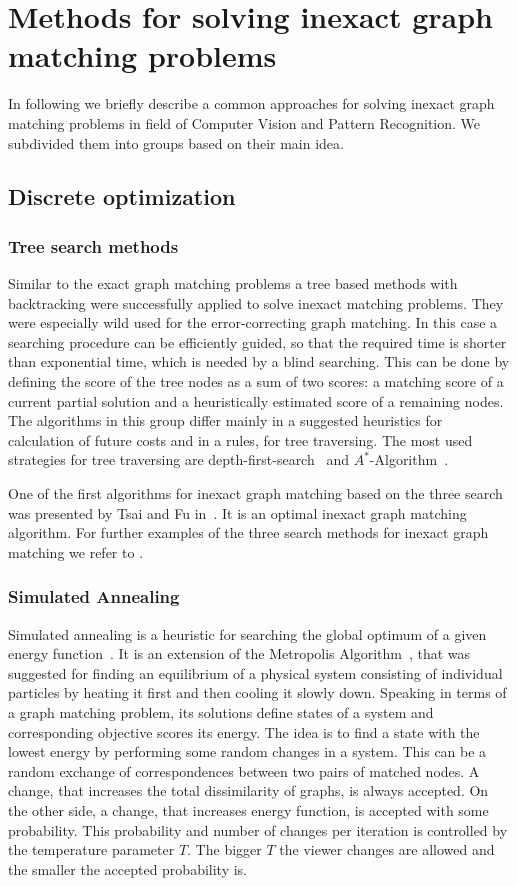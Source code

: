 \section{Methods for solving inexact graph matching problems}
In following we briefly describe a common approaches for solving inexact graph matching problems in field of Computer Vision and Pattern Recognition. We subdivided them into groups based on their main idea.
\subsection{Discrete optimization}
\subsubsection{Tree search methods}
Similar to the exact graph matching problems a tree based methods with backtracking were successfully applied to solve inexact matching problems. They were especially wild used for the error-correcting graph matching. In this case a searching procedure can be efficiently guided, so that the required time is shorter than exponential time, which is needed by a blind searching. This can be done by defining the score of the tree nodes as a sum of two scores: a matching score of a current partial solution and a heuristically estimated score of a remaining nodes. The algorithms in this group differ mainly in a suggested heuristics for calculation of future costs and in a rules, for tree traversing. The most used strategies for tree traversing are depth-first-search~\cite{Cormen} and $A^*$-Algorithm~\cite{AStar}.

One of the first algorithms for inexact graph matching based on the three search was presented by Tsai and Fu in~\cite{Fu1979}. It is an optimal inexact graph matching algorithm. For further examples of the three search methods for inexact graph matching we refer to \cite{Bunke1983_inexactGM,Shapiro1981,Wang1995}.
\subsubsection{Simulated Annealing}
Simulated annealing is a heuristic for searching the global optimum of a given energy function~\cite{Burkard98thequadratic}. It is an extension of the Metropolis Algorithm~\cite{Metropolis}, that was suggested for finding an equilibrium of a physical system consisting of individual particles by heating it first and then cooling it slowly down. Speaking in terms of a graph matching problem, its solutions define states of a system and corresponding objective scores its energy. The idea is to find a state with the lowest energy by performing some random changes in a system. This can be a random exchange of correspondences between two pairs of matched nodes. A change, that increases the total dissimilarity of graphs, is always accepted. On the other side, a change, that increases energy function, is accepted with some probability. This probability and number of changes per iteration is controlled by the temperature parameter $T$. The bigger $T$ the viewer changes are allowed and the smaller the accepted probability is. 

